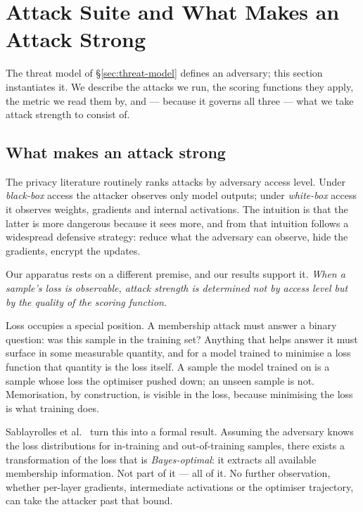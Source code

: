 \section{Attack Suite and What Makes an Attack Strong}
\label{sec:attacks}

The threat model of \S\ref{sec:threat-model} defines an adversary; this
section instantiates it. We describe the attacks we run, the scoring functions
they apply, the metric we read them by, and --- because it governs all three
--- what we take attack strength to consist of.

\subsection{What makes an attack strong}
\label{sec:attacks-strength}

The privacy literature routinely ranks attacks by adversary access level.
Under \emph{black-box} access the attacker observes only model outputs; under
\emph{white-box} access it observes weights, gradients and internal
activations. The intuition is that the latter is more dangerous because it
sees more, and from that intuition follows a widespread defensive strategy:
reduce what the adversary can observe, hide the gradients, encrypt the
updates.

Our apparatus rests on a different premise, and our results support it.
\emph{When a sample's loss is observable, attack strength is determined not by
access level but by the quality of the scoring function.}

Loss occupies a special position. A membership attack must answer a binary
question: was this sample in the training set? Anything that helps answer it
must surface in some measurable quantity, and for a model trained to minimise
a loss function that quantity is the loss itself. A sample the model trained
on is a sample whose loss the optimiser pushed down; an unseen sample is not.
Memorisation, by construction, is visible in the loss, because minimising the
loss is what training does.

Sablayrolles et al.~\cite{sablayrolles2019whitebox} turn this into a formal
result. Assuming the adversary knows the loss distributions for in-training
and out-of-training samples, there exists a transformation of the loss that is
\emph{Bayes-optimal}: it extracts all available membership information. Not
part of it --- all of it. No further observation, whether per-layer gradients,
intermediate activations or the optimiser trajectory, can take the attacker
past that bound.

